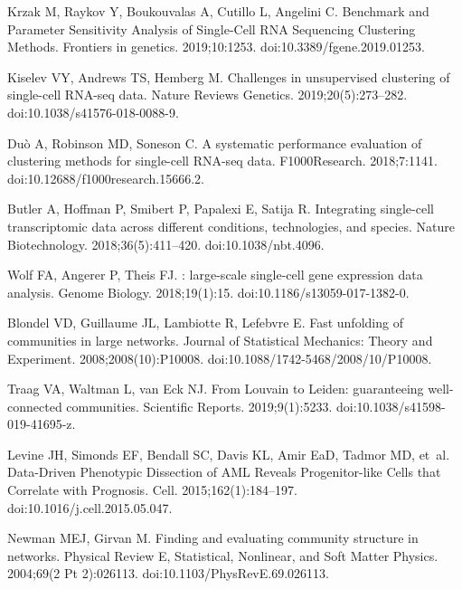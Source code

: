 \documentclass[10pt,letterpaper]{article}
\begin{document}
\begin{thebibliography}{10}
Krzak M, Raykov Y, Boukouvalas A, Cutillo L, Angelini C.
\newblock Benchmark and Parameter Sensitivity Analysis of Single-Cell {RNA}
  Sequencing Clustering Methods.
\newblock Frontiers in genetics. 2019;10:1253.
\newblock doi:{10.3389/fgene.2019.01253}.

Kiselev VY, Andrews TS, Hemberg M.
\newblock Challenges in unsupervised clustering of single-cell {RNA}-seq data.
\newblock Nature Reviews Genetics. 2019;20(5):273--282.
\newblock doi:{10.1038/s41576-018-0088-9}.

{Duò} A, Robinson MD, Soneson C.
\newblock A systematic performance evaluation of clustering methods for
  single-cell {RNA}-seq data.
\newblock F1000Research. 2018;7:1141.
\newblock doi:{10.12688/f1000research.15666.2}.

Butler A, Hoffman P, Smibert P, Papalexi E, Satija R.
\newblock Integrating single-cell transcriptomic data across different
  conditions, technologies, and species.
\newblock Nature Biotechnology. 2018;36(5):411--420.
\newblock doi:{10.1038/nbt.4096}.

Wolf FA, Angerer P, Theis FJ.
: large-scale single-cell gene expression data analysis.
\newblock Genome Biology. 2018;19(1):15.
\newblock doi:{10.1186/s13059-017-1382-0}.

Blondel VD, Guillaume JL, Lambiotte R, Lefebvre E.
\newblock Fast unfolding of communities in large networks.
\newblock Journal of Statistical Mechanics: Theory and Experiment.
  2008;2008(10):P10008.
\newblock doi:{10.1088/1742-5468/2008/10/P10008}.

Traag VA, Waltman L, van Eck NJ.
\newblock From Louvain to Leiden: guaranteeing well-connected communities.
\newblock Scientific Reports. 2019;9(1):5233.
\newblock doi:{10.1038/s41598-019-41695-z}.

Levine JH, Simonds EF, Bendall SC, Davis KL, Amir EaD, Tadmor MD, et~al.
\newblock Data-Driven Phenotypic Dissection of {AML} Reveals Progenitor-like
  Cells that Correlate with Prognosis.
\newblock Cell. 2015;162(1):184--197.
\newblock doi:{10.1016/j.cell.2015.05.047}.

Newman MEJ, Girvan M.
\newblock Finding and evaluating community structure in networks.
\newblock Physical Review E, Statistical, Nonlinear, and Soft Matter Physics.
  2004;69(2 Pt 2):026113.
\newblock doi:{10.1103/{PhysRevE}.69.026113}.


\end{thebibliography}
\end{document}
